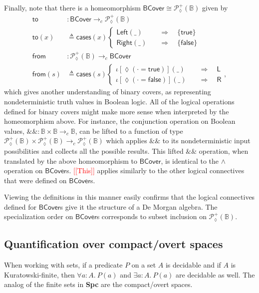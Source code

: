 \documentclass[conference]{IEEEtran}
\newcommand{\PLower}{\mathcal{P}_\lozenge}
\newcommand{\cto}{\to_c}
\newcommand{\bool}{\mathbb{B}}
\newcommand{\wildcard}{\_}
\newcommand{\oinclf}[1]{\iota[{#1}]}
\newcommand{\oincl}[2]{\oinclf{#1} \left({#2}\right)}
\newcommand{\Branch}{\Rightarrow}
\newcommand{\note}[1]{\textcolor{red}{[[{#1}]]}}
\newcommand{\btrue}{\mathsf{true}}
\newcommand{\bfalse}{\mathsf{false}}
\newcommand{\BCover}{\mathsf{BCover}}
\begin{document}
Finally, note that there is a homeomorphism $\BCover \cong \PLower^+(\bool)$ given by
\begin{align*}
\mathsf{to} &: \BCover \cto \PLower^+(\bool)
\\ \mathsf{to}(x) &\triangleq
  \mathsf{cases}(x)
  \begin{cases}
\mathsf{Left}(\wildcard)
 \quad &\Branch \quad
 \{ \btrue \}
\\
\mathsf{Right}(\wildcard)
 \quad &\Branch \quad
 \{ \bfalse \}
  \end{cases}
\\
\mathsf{from} &: \PLower^+(\bool) \cto \BCover
\\ \mathsf{from}(s) &\triangleq
  \mathsf{cases}(s)
  \begin{cases}
 \oincl{\lozenge(\cdot = \btrue)}{\wildcard}
 \quad &\Branch \quad
 \mathsf{L}
\\
 \oincl{\lozenge(\cdot = \bfalse)}{\wildcard}
 \quad &\Branch \quad
 \mathsf{R}
  \end{cases},
\end{align*}
which gives another understanding of binary covers, as representing nondeterministic truth values in Boolean logic. All of the logical operations defined for binary covers might make more sense when interpreted by the homeomorphism above. For instance, the conjunction operation on Boolean values,
$\&\& : \bool \times \bool \cto \bool$, can be lifted to a function of type $\PLower^+(\bool) \times \PLower^+(\bool) \cto \PLower^+(\bool)$ which applies $\&\&$ to its nondeterministic input possibilities and collects all the possible results. This lifted $\&\&$ operation, when translated by the above homeomorphism to $\BCover$, is identical to the $\wedge$ operation on $\BCover$s. \note{This} applies similarly to the other logical connectives that were defined on $\BCover$s.

Viewing the definitions in this manner easily confirms that the logical connectives defined for $\BCover$s give it the structure of a De Morgan algebra.
The specialization order on $\BCover$s corresponds to subset inclusion on $\PLower^+(\bool)$.

\subsection{Quantification over compact/overt spaces}

When working with sets, if a predicate $P$ on a set $A$ is decidable and if $A$ is Kuratowski-finite, then $\forall a : A.\ P(a)$ and $\exists a : A.\ P(a)$ are decidable as well. The analog of the finite sets in \textbf{Spc} are the compact/overt spaces.
\end{document}
